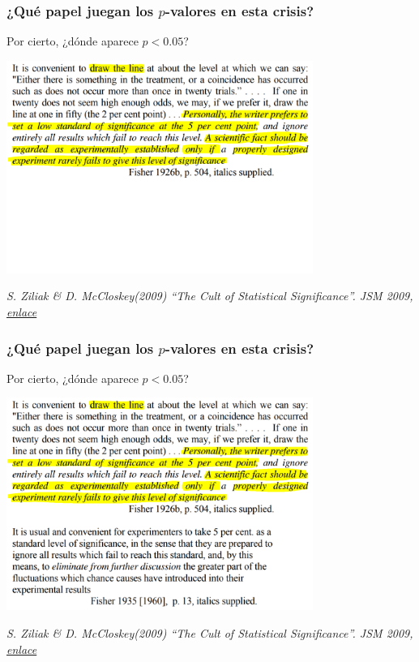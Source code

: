 \documentclass[9pt]{beamer}
\begin{document}
\begin{frame}
  \frametitle{¿Qué papel juegan los $p$-valores en esta crisis?}
  Por cierto, ¿dónde aparece $p < 0.05$?
 \begin{center}
    \includegraphics[width=10cm]{images/fisher_p-value_2-5.png}
 \end{center}\hfill
    {\scriptsize \textit{S. Ziliak \& D. McCloskey(2009) ``The Cult of
        Statistical Significance''. JSM 2009, \href{https://www.deirdremccloskey.com/docs/jsm.pdf}{enlace}}}
\end{frame}

\begin{frame}
  \frametitle{¿Qué papel juegan los $p$-valores en esta crisis?}
  Por cierto, ¿dónde aparece $p < 0.05$?
 \begin{center}
    \includegraphics[width=10cm]{images/fisher_p-value_3.png}
 \end{center}\hfill
    {\scriptsize \textit{S. Ziliak \& D. McCloskey(2009) ``The Cult of
        Statistical Significance''. JSM 2009, \href{https://www.deirdremccloskey.com/docs/jsm.pdf}{enlace}}}
\end{frame}
\end{document}
